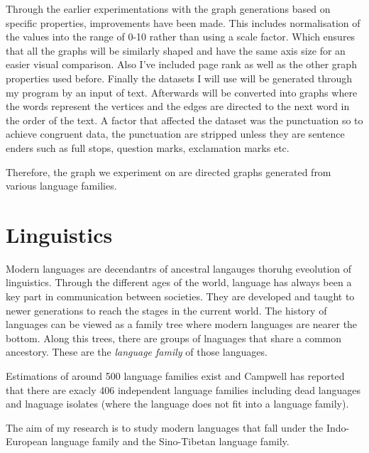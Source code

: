 Through the earlier experimentations with the graph generations based on specific properties, improvements have been made. This includes normalisation of the values into the range of 0-10 rather than using a scale factor. Which ensures that all the graphs will be similarly shaped and have the same axis size for an easier visual comparison. Also I've included page rank as well as the other graph properties used before. Finally the datasets I will use will be generated through my program by an input of text. Afterwards will be converted into graphs where the words represent the vertices and the edges are directed to the next word in the order of the text. A factor that affected the dataset was the punctuation so to achieve congruent data, the punctuation are stripped unless they are sentence enders such as full stops, question marks, exclamation marks etc. 

Therefore, the graph we experiment on are directed graphs generated from various language families.

\section{Linguistics}
Modern languages are decendantrs of ancestral langauges thoruhg eveolution of linguistics. Through the different ages of the world, language has always been a key part in communication between societies. They are developed and taught to newer generations to reach the stages in the current world. The history of languages can be viewed as a family tree where modern languages are nearer the bottom. Along this trees, there are groups of lnaguages that share a common ancestory. These are the \emph{language family} of those languages.

Estimations of around 500 language families exist and Campwell \cite{campbell2018many} has reported that there are exacly 406 independent language families including dead languages and lnaguage isolates (where the language does not fit into a language family).

The aim of my research is to study modern languages that fall under the Indo-European language family and the Sino-Tibetan language family.

\cite{rowe2022concise}
\cite{eberhard2023a}

